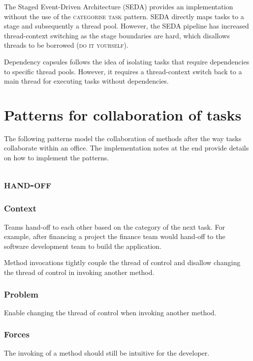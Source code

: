 \documentclass[prodmode]{style/acmlarge}
\begin{document}
The Staged Event-Driven Architecture (SEDA) \cite{seda} provides an
implementation without the use of the \textsc{categorise task} pattern.
SEDA directly maps tasks to a stage and subsequently a thread pool.
However, the SEDA pipeline has increased thread-context switching as the stage
boundaries are hard, which disallows threads to be borrowed (\textsc{do it
yourself}).

Dependency capsules \cite{dependency-capsules} follows the idea of isolating
tasks that require dependencies to specific thread pools.  However, it
requires a thread-context switch back to a main thread for executing tasks
without dependencies.



\section{Patterns for collaboration of tasks}

The following patterns model the collaboration of methods after the way tasks
collaborate within an office.  The implementation notes at the end provide
details on how to implement the patterns.


\subsection{\textsc{\textbf{hand-off}}}

\subsubsection*{Context} Teams hand-off to each other based on the category of
the next task.  For example, after financing a project the finance team would
hand-off to the software development team to build the application.

Method invocations tightly couple the thread of control and disallow changing
the thread of control in invoking another method.

\subsubsection*{Problem} Enable changing the thread of control when invoking
another method.

\subsubsection*{Forces} The invoking of a method should still be intuitive for
the developer.
\end{document}
